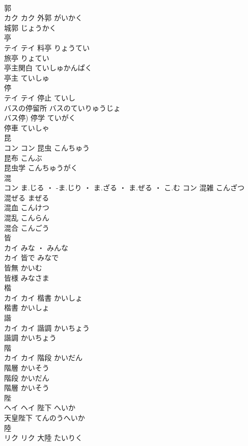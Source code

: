 \documentclass[8pt]{extreport}
\begin{document}
\begin{CJK}{UTF8}{min}
\\	郭	
\\	カク		カク	外郭	がいかく	
\\	城郭	じょうかく	
\\	亭	
\\	テイ		テイ	料亭	りょうてい	
\\	旅亭	りょてい	
\\	亭主関白	ていしゅかんぱく	
\\	亭主	ていしゅ	
\\	停	
\\	テイ		テイ	停止	ていし	
\\	バスの停留所	バスのていりゅうじょ	
\\	バス停)	停学	ていがく	
\\	停車	ていしゃ	
\\	昆	
\\	コン		コン	昆虫	こんちゅう	
\\	昆布	こんぶ	
\\	昆虫学	こんちゅうがく	
\\	混	
\\	コン	ま.じる ・ -ま.じり ・ ま.ざる ・ ま.ぜる ・ こ.む	コン	混雑	こんざつ	
\\	混ぜる	まぜる	
\\	混血	こんけつ	
\\	混乱	こんらん	
\\	混合	こんごう	
\\	皆	
\\	カイ	みな ・ みんな
\\	カイ	皆で	みなで	
\\	皆無	かいむ	
\\	皆様	みなさま	
\\	楷	
\\	カイ		カイ	楷書	かいしょ	
\\	楷書	かいしょ	
\\	諧	
\\	カイ		カイ	諧調	かいちょう	
\\	諧調	かいちょう	
\\	階	
\\	カイ		カイ	階段	かいだん	
\\	階層	かいそう	
\\	階段	かいだん	
\\	階層	かいそう	
\\	陛	
\\	ヘイ		ヘイ	陛下	へいか	
\\	天皇陛下	てんのうへいか	
\\	陸	
\\	リク		リク	大陸	たいりく	

\end{CJK}
\end{document}
